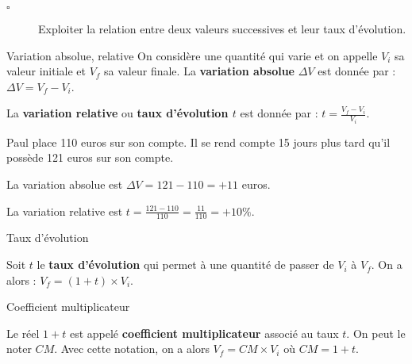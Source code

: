 \begin{titre}

\end{titre}


\begin{CpsCol}
\begin{description}
\item[$\square$] Exploiter la relation entre deux valeurs successives et leur taux d’évolution.
\end{description}
\end{CpsCol}


\begin{DefT}{Variation absolue, relative}
On considère une quantité qui varie et on appelle $V_i$ sa valeur initiale et $V_f$ sa valeur finale. 
La \textbf{variation absolue} $\Delta V$ est donnée par : $\Delta V = V_f - V_i$.

La \textbf{variation relative} ou \textbf{taux d'évolution $t$} est donnée par : $t = \frac{V_f - V_i}{V_i}$.
\end{DefT}

\begin{Ex}
Paul place 110 euros sur son compte. Il se rend compte 15 jours plus tard qu'il possède 121 euros sur son compte.

La variation absolue est $\Delta V = 121 - 110 = +11$ euros.

La variation relative est $t = \frac{121 - 110}{110}=\frac{11}{110}= +10\%$.
\end{Ex}





\begin{DefT}{Taux d'évolution}

 Soit $t$ le \textbf{taux d'évolution} qui permet à une quantité de passer de $V_i$ à $V_f$.
 On a alors : $V_f = (1+t) \times V_i$.
\end{DefT}

 
\begin{DefT}{Coefficient multiplicateur}
 
Le réel $1+t$ est appelé \textbf{coefficient multiplicateur} associé au taux $t$. On peut le noter $CM$. Avec cette notation, on a alors  $V_f = CM \times V_i$ où $CM =1+t$. 
\end{DefT}

